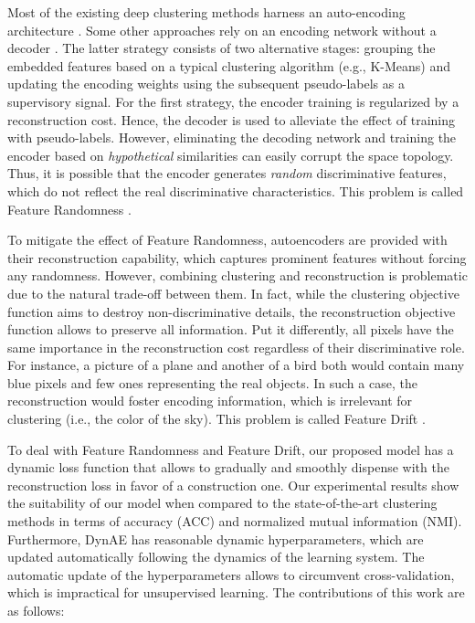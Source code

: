 \documentclass{article}
\begin{document}
Most of the existing deep clustering methods harness an auto-encoding architecture \cite{paper27,paper28,paper29,paper30,paper31}. Some other approaches rely on an encoding network without a decoder \cite{paper21,paper22,paper23,paper24,paper26}. The latter strategy consists of two alternative stages: grouping the embedded features based on a typical clustering algorithm (e.g., K-Means) and updating the encoding weights using the subsequent pseudo-labels as a supervisory signal. For the first strategy, the encoder training is regularized by a reconstruction cost. Hence, the decoder is used to alleviate the effect of training with pseudo-labels. However, eliminating the decoding network and training the encoder based on \textit{hypothetical} similarities can easily corrupt the space topology. Thus, it is possible that the encoder generates \textit{random} discriminative features, which do not reflect the real discriminative characteristics. This problem is called Feature Randomness \cite{paper98}.
 
To mitigate the effect of Feature Randomness, autoencoders are provided with their reconstruction capability, which captures prominent features without forcing any randomness. However, combining clustering and reconstruction is problematic due to the natural trade-off between them. In fact, while the clustering objective function aims to destroy non-discriminative details, the reconstruction objective function allows to preserve all information. Put it differently, all pixels have the same importance in the reconstruction cost regardless of their discriminative role. For instance, a picture of a plane and another of a bird both would contain many blue pixels and few ones representing the real objects. In such a case, the reconstruction would foster encoding information, which is irrelevant for clustering (i.e., the color of the sky). This problem is called Feature Drift \cite{paper98}.

To deal with Feature Randomness and Feature Drift, our proposed model has a dynamic loss function that allows to gradually and smoothly dispense with the reconstruction loss in favor of a construction one. Our experimental results show the suitability of our model when compared to the state-of-the-art clustering methods in terms of accuracy (ACC) and normalized mutual information (NMI). Furthermore, DynAE has reasonable dynamic hyperparameters, which are updated automatically following the dynamics of the learning system. The automatic update of the hyperparameters allows to circumvent cross-validation, which is impractical for unsupervised learning. The contributions of this work are as follows:
\end{document}
